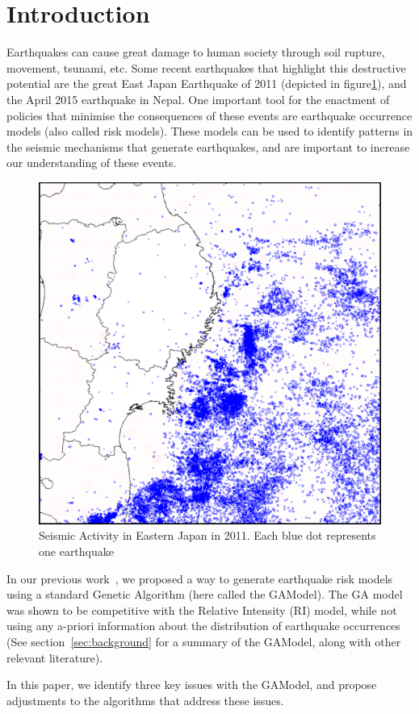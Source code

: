 \section{Introduction}\label{intro}

Earthquakes can cause great damage to human society through soil
rupture, movement, tsunami, etc. Some recent earthquakes that
highlight this destructive potential are the great East Japan
Earthquake of 2011 (depicted in figure\ref{GreatEastJapan}), and the
April 2015 earthquake in Nepal. One important tool for the enactment
of policies that minimise the consequences of these events are
earthquake occurrence models (also called risk models). These models
can be used to identify patterns in the seismic mechanisms that
generate earthquakes, and are important to increase our understanding
of these events.


\begin{figure}[]
\centering
\includegraphics[width=.45\textwidth]{img/earthquakes2011.png}
\caption{Seismic Activity in Eastern Japan in 2011. Each blue dot
  represents one earthquake}
\label{GreatEastJapan}
\end{figure}

In our previous work~\cite{ecta14}, we proposed a way to generate
earthquake risk models using a standard Genetic Algorithm (here called
the GAModel). The GA model was shown to be competitive with the
Relative Intensity (RI) model, while not using any a-priori
information about the distribution of earthquake occurrences (See
section~\ref{sec:background} for a summary of the GAModel, along with
other relevant literature).

In this paper, we identify three key issues with the GAModel, and
propose adjustments to the algorithms that address these issues.

